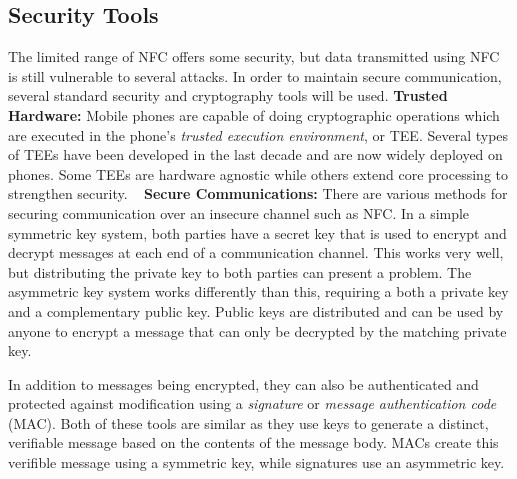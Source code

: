 \documentclass{sig-alternate}
\begin{document}
\subsection{Security Tools}
The limited range of NFC offers some security, but data transmitted using NFC is still vulnerable to several attacks. In order to maintain secure communication, several standard security and cryptography tools will be used.
\vspace{2mm}\newline
\noindent\textbf{Trusted Hardware:}
Mobile phones are capable of doing cryptographic operations which are executed in the phone's \textit{trusted execution environment}, or TEE. Several types of TEEs have been developed in the last decade and are now widely deployed on phones. Some TEEs are hardware agnostic while others extend core processing to strengthen security.
~\cite{Ticket2011}
\vspace{2mm}\newline
\textbf{Secure Communications:}
There are various methods for securing communication over an insecure channel such as NFC. In a simple symmetric key system, both parties have a secret key that is used to encrypt and decrypt messages at each end of a communication channel. This works very well, but distributing the private key to both parties can present a problem. The asymmetric key system works differently than this, requiring a both a private key and a complementary public key. Public keys are distributed and can be used by anyone to encrypt a message that can only be decrypted by the matching private key.

In addition to messages being encrypted, they can also be authenticated and protected against modification using a \textit{signature} or \textit{message authentication code} (MAC). Both of these tools are similar as they use keys to generate a distinct, verifiable message based on the contents of the message body. MACs create this verifible message using a symmetric key, while signatures use an asymmetric key.\cite{crypto}
\end{document}
